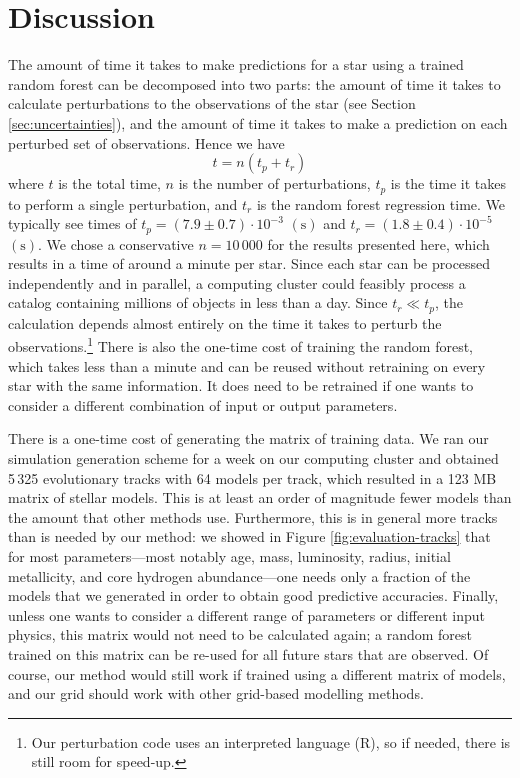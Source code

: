 \documentclass[twocolumn,twocolappendix]{aastex6}
\newif\ifref
\newcommand{\mb}[1]{\ifref\boldmath\textbf{#1}\unboldmath\else #1\fi}
\begin{document}
\section{Discussion}
The amount of time it takes to make predictions for a star using a trained random forest can be decomposed into two parts: the amount of time it takes to calculate perturbations to the observations of the star \mb{(see Section \ref{sec:uncertainties})}, and the amount of time it takes to make a prediction on each perturbed set of observations. Hence we have
\begin{equation}
    t = n(t_p + t_r)
\end{equation}
where $t$ is the total time, $n$ is the number of perturbations, $t_p$ is the time it takes to perform a single perturbation, and $t_r$ is the random forest regression time. We typically see times of $t_p = (7.9 \pm 0.7) \cdot 10^{-3}$ $(\si{\s})$ and $t_r = (1.8 \pm 0.4) \cdot 10^{-5}$ $(\si{\s})$. We chose a conservative $n=10\,000$ for the results presented here, which results in a time of around a minute per star. Since each star can be processed independently and in parallel, a computing cluster could feasibly process a catalog containing millions of objects in less than a day. Since \mb{$t_r \ll t_p$}, the calculation depends almost entirely on the time it takes to perturb the observations.\footnote{Our perturbation code uses an interpreted language (R), so if needed, there is still room for speed-up.} There is also the one-time cost of training the random forest, which takes less than a minute and can be reused without retraining on every star with the same information. It does need to be retrained if one wants to consider a different combination of input or output parameters. 

There is a one-time cost of generating the matrix of training data. We ran our simulation generation scheme for a week on our computing cluster and obtained 5\,325 evolutionary tracks with 64 models per track, \mb{which resulted in a} 123 MB \mb{matrix of stellar models}. This is at least an order of magnitude fewer models than the amount that other methods use. Furthermore, this is in general more tracks than is needed by our method: we showed in Figure \ref{fig:evaluation-tracks} that for most parameters---most notably age, mass, luminosity, radius, initial metallicity, and core hydrogen abundance---one needs only a fraction of the models that we generated in order to obtain good predictive accuracies. Finally, unless one wants to consider a different range of parameters or different input physics, this matrix would not need to be calculated again; a random forest trained on this matrix can be re-used for all future stars that are observed. Of course, our method would still work if trained using a different matrix of models, and our grid should work with other grid-based modelling methods. 
\end{document}
